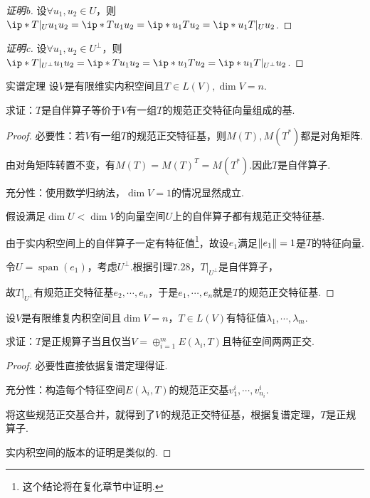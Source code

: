 \begin{proof}[证明b]
    设\(\forall u_1,u_2 \in U\)，则\(\ip*{T|_U u_1}{u_2}=\ip*{Tu_1}{u_2}=\ip*{u_1}{Tu_2}=\ip*{u_1}{T|_U u_2}\).
\end{proof}

\begin{proof}[证明c]
    设\(\forall u_1,u_2 \in U^\bot\)，则\(\ip*{T|_{U^\bot}u_1}{u_2}=\ip*{Tu_1}{u_2}=\ip*{u_1}{Tu_2}=\ip*{u_1}{T|_{U^\bot}u_2}\).
\end{proof}

\begin{theorem}[7.29]\label{thm 7.29} 实谱定理 \:
    设\(V\)是有限维实内积空间且\(T \in L(V),\dim V=n\).

    求证：\(T\)是自伴算子等价于\(V\)有一组\(T\)的规范正交特征向量组成的基.
\end{theorem}

\begin{proof}
    必要性：若\(V\)有一组\(T\)的规范正交特征基，则\(M(T),M(T^*)\)都是对角矩阵.

    由对角矩阵转置不变，有\(M(T)=M(T)^T=M(T^*)\).因此\(T\)是自伴算子.
    
    充分性：使用数学归纳法，\(\dim V=1\)的情况显然成立.
    
    假设满足\(\dim U<\dim V\)的向量空间\(U\)上的自伴算子都有规范正交特征基.
    
    由于实内积空间上的自伴算子一定有特征值\footnote{这个结论将在复化章节中证明.}，故设\(e_1\)满足\(\norm*{e_1}=1\)是\(T\)的特征向量.
    
    令\(U=\operatorname{span}(e_1)\)，考虑\(U^\bot\).根据引理7.28，\(T|_{U^\bot}\)是自伴算子，
    
    故\(T|_{U^\bot}\)有规范正交特征基\(e_2,\cdots,e_n\)，于是\(e_1,\cdots,e_n\)就是\(T\)的规范正交特征基.
\end{proof}

\newpage

\begin{problem}[4]\label{7.B.4}
    设\(V\)是有限维复内积空间且\(\dim V=n\)，\(T \in L(V)\)有特征值\(\lambda_1,\cdots,\lambda_m\).

    求证：\(T\)是正规算子当且仅当\(V=\oplus_{i=1}^m E(\lambda_i,T)\)且特征空间两两正交.
\end{problem}

\begin{proof}
    必要性直接依据复谱定理得证.

    充分性：构造每个特征空间\(E(\lambda_i,T)\)的规范正交基\(v_1^i,\cdots,v_{n_i}^i\).
    
    将这些规范正交基合并，就得到了\(V\)的规范正交特征基，根据复谱定理，\(T\)是正规算子.
    
    实内积空间的版本的证明是类似的.
\end{proof}

